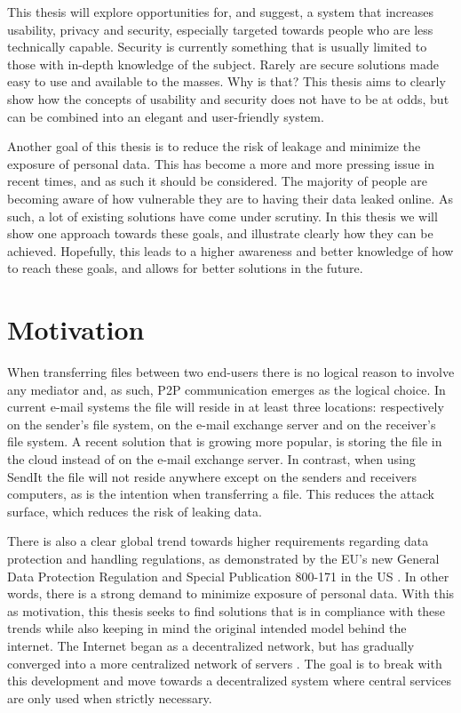 This thesis will explore opportunities for, and suggest, a system that increases usability, privacy and security, especially targeted towards people who are less technically capable. Security is currently something that is usually limited to those with in-depth knowledge of the subject. Rarely are secure solutions made easy to use and available to the masses. Why is that? This thesis aims to clearly show how the concepts of usability and security does not have to be at odds, but can be combined into an elegant and user-friendly system.

Another goal of this thesis is to reduce the risk of leakage and minimize the exposure of personal data. This has become a more and more pressing issue in recent times, and as such it should be considered. The majority of people are becoming aware of how vulnerable they are to having their data leaked online. As such, a lot of existing solutions have come under scrutiny. In this thesis we will show one approach towards these goals, and illustrate clearly how they can be achieved. Hopefully, this leads to a higher awareness and better knowledge of how to reach these goals, and allows for better solutions in the future.

%
\section{Motivation}
\label{sec:motivation}
%
When transferring files between two end-users there is no logical reason to involve any mediator and, as such, P2P communication emerges as the logical choice. In current e-mail systems the file will reside in at least three locations: respectively on the sender's file system, on the e-mail exchange server and on the receiver's file system. A recent solution that is growing more popular, is storing the file in the cloud instead of on the e-mail exchange server. In contrast, when using SendIt the file will not reside anywhere except on the senders and receivers computers, as is the intention when transferring a file. This reduces the attack surface, which reduces the risk of leaking data.

There is also a clear global trend towards higher requirements regarding data protection and handling regulations, as demonstrated by the EU's new General Data Protection Regulation \cite{law_gdpr,ar_gdpr} and Special Publication 800-171 in the US \cite{law_sp800}. In other words, there is a strong demand to minimize exposure of personal data. With this as motivation, this thesis seeks to find solutions that is in compliance with these trends while also keeping in mind the original intended model behind the internet. The Internet began as a decentralized network, but has gradually converged into a more centralized network of servers \cite{ar_decent}. The goal is to break with this development and move towards a decentralized system where central services are only used when strictly necessary.

